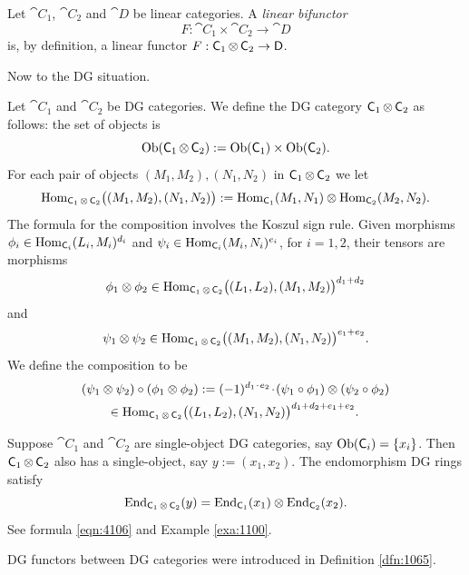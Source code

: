\begin{dfn} \label{dfn:1965}
Let $\cat{C}_1$, $\cat{C}_2$ and $\cat{D}$ be linear categories. A 
{\em linear bifunctor}%
\[ F : \cat{C}_1 \times \cat{C}_2 \to \cat{D} \]
is, by definition, a linear functor 
$F : \operatorname{\mathsf{C}}_1 \otimes \operatorname{\mathsf{C}}_2 \to \operatorname{\mathsf{D}}$.
\end{dfn}

Now to the DG situation. 

\begin{dfn} \label{dfn:2010}
Let $\cat{C}_1$ and $\cat{C}_2$ be DG categories. 
We define the DG category $\operatorname{\mathsf{C}}_1 \otimes \operatorname{\mathsf{C}}_2$ as follows: the 
set of objects is 
\[ \operatorname{Ob}(\operatorname{\mathsf{C}}_1 \otimes \operatorname{\mathsf{C}}_2) :=
\operatorname{Ob}(\operatorname{\mathsf{C}}_1) \times \operatorname{Ob}(\operatorname{\mathsf{C}}_2) . \]
For each pair of objects 
$(M_1, M_2), (N_1, N_2)$ in $\operatorname{\mathsf{C}}_1 \otimes \operatorname{\mathsf{C}}_2$
we let 
\[ \operatorname{Hom}_{\operatorname{\mathsf{C}}_1 \otimes \operatorname{\mathsf{C}}_2}
\bigl( (M_1, M_2), (N_1, N_2) \bigr) := 
\operatorname{Hom}_{\operatorname{\mathsf{C}}_1} (M_1, N_1) \otimes 
\operatorname{Hom}_{\operatorname{\mathsf{C}}_2} (M_2, N_2) . \]
The formula for the composition involves the Koszul sign rule. Given 
morphisms 
$\phi_i \in \operatorname{Hom}_{\operatorname{\mathsf{C}}_i}(L_i, M_i)^{d_i}$
and
$\psi_i \in \operatorname{Hom}_{\operatorname{\mathsf{C}}_i}(M_i, N_i)^{e_i}$, 
for $i = 1, 2$, their tensors are morphisms 
\[ \phi_1 \otimes \phi_2 \in 
\operatorname{Hom}_{\operatorname{\mathsf{C}}_1 \otimes \operatorname{\mathsf{C}}_2}
\bigl( (L_1, L_2), (M_1, M_2) \bigr)^{d_1 + d_2} \]
and 
\[ \psi_1 \otimes \psi_2 \in 
\operatorname{Hom}_{\operatorname{\mathsf{C}}_1 \otimes \operatorname{\mathsf{C}}_2}
\bigl( (M_1, M_2), (N_1, N_2) \bigr)^{e_1 + e_2} . \]
We define the composition to be 
\[ \begin{aligned}
& (\psi_1 \otimes \psi_2) \circ (\phi_1 \otimes \phi_2) := 
(-1)^{d_1 \mspace{1.5mu}{\cdot}\mspace{1.5mu} e_2} \mspace{1.5mu}{\cdot}\mspace{1.5mu} (\psi_1 \circ \phi_1) \otimes
(\psi_2 \circ \phi_2)
\\ & \qquad 
\in \operatorname{Hom}_{\operatorname{\mathsf{C}}_1 \otimes \operatorname{\mathsf{C}}_2}
\bigl( (L_1, L_2), (N_1, N_2) \bigr)^{d_1 + d_2 + e_1 + e_2} . 
\end{aligned} \]
\end{dfn}

\begin{exa}  \label{exa:2010}
Suppose $\cat{C}_1$ and $\cat{C}_2$ are single-object DG 
categories, say $\operatorname{Ob}(\operatorname{\mathsf{C}}_i) = \{ x_i \}$. 
Then $\operatorname{\mathsf{C}}_1 \otimes \operatorname{\mathsf{C}}_2$ also has a single-object, say 
$y := (x_1, x_2)$. 
The endomorphism DG rings satisfy
\[ \operatorname{End}_{\operatorname{\mathsf{C}}_1 \otimes \operatorname{\mathsf{C}}_2}(y) = 
\operatorname{End}_{\operatorname{\mathsf{C}}_1}(x_1) \otimes \operatorname{End}_{\operatorname{\mathsf{C}}_2}(x_2) . \]
See formula \ref{eqn:4106} and Example \ref{exa:1100}. 
\end{exa}

DG functors between DG categories were introduced in Definition \ref{dfn:1065}.

